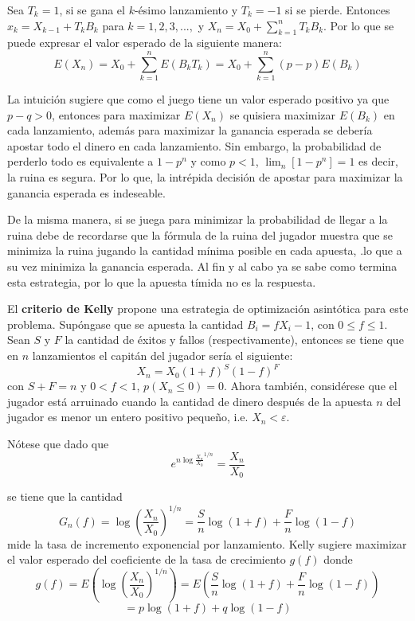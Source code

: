 Sea $T_k = 1$, si se gana el $k$-ésimo lanzamiento y $T_k = -1$ si se pierde. Entonces $x_k = X_{k-1} + T_k B_k$ para $k=1,2,3, ...,$ y $X_n = X_0 + \sum_{k=1}^{n}{T_k B_k}$. Por lo que se puede expresar el valor esperado de la siguiente manera:
\[E(X_n) = X_0 + \sum_{k=1}^{n}{E(B_k T_k)} = X_0 + \sum_{k=1}^{n}{(p-p)E(B_k)}\]
 
La intuición sugiere que como el juego tiene un valor esperado positivo ya que $p - q > 0$, entonces para maximizar $E(X_n)$ se quisiera maximizar $E(B_k)$ en cada lanzamiento, además para maximizar la ganancia esperada se debería apostar todo el dinero en cada lanzamiento. Sin embargo, la probabilidad de perderlo todo es equivalente a $1 - p^n$ y como $p < 1$, $\lim_n[1 - p^n] = 1$ es decir, la ruina es segura. Por lo que, la intrépida decisión de apostar para maximizar la ganancia esperada es indeseable.

De la misma manera, si se juega para minimizar la probabilidad de llegar a la ruina debe de recordarse que la fórmula de la ruina del jugador muestra que se minimiza la ruina jugando la cantidad mínima posible en cada apuesta, .lo que a su vez minimiza la ganancia esperada. Al fin y al cabo ya se sabe como termina esta estrategia, por lo que la apuesta tímida no es la respuesta.

El \textbf{criterio de Kelly} \cite{kelly1956new} propone una estrategia de optimización asintótica para este problema. Supóngase que se apuesta la cantidad $B_i = fX_i-1$, con $0 \leqslant f \leqslant 1$. Sean $S$ y $F$ la cantidad de éxitos y fallos (respectivamente), entonces se tiene que en $n$ lanzamientos el capitán del jugador sería el siguiente:
\[X_n = X_0(1+f)^S(1-f)^F\] con $S + F = n$ y $0<f<1$, $p(X_n \leqslant 0) = 0 $. 
Ahora también, considérese que el jugador está arruinado cuando la cantidad de dinero después de la apuesta $n$ del jugador es menor un entero positivo pequeño, i.e. $X_n < \varepsilon$.

Nótese que dado que
\[e^{n \log{\frac{X_n}{X_0}^{1/n}}} = \frac{X_n}{X_0}\]

se tiene que la cantidad
\[G_n(f) = \log{\left(\frac{X_n}{X_0}\right)^{1/n}} = \frac{S}{n}\log(1+f) + \frac{F}{n}\log(1-f)\]
mide la tasa de incremento exponencial por lanzamiento. Kelly sugiere maximizar el valor esperado del coeficiente de la tasa de crecimiento $g(f)$ donde
\[g(f) = E\left(\log\left(\frac{X_n}{X_0}\right)^{1/n}\right) = E\left({\frac{S}{n}\log(1+f) + \frac{F}{n}\log(1-f)}\right)\]
\[=p\log(1+f)+q\log(1-f)\]


